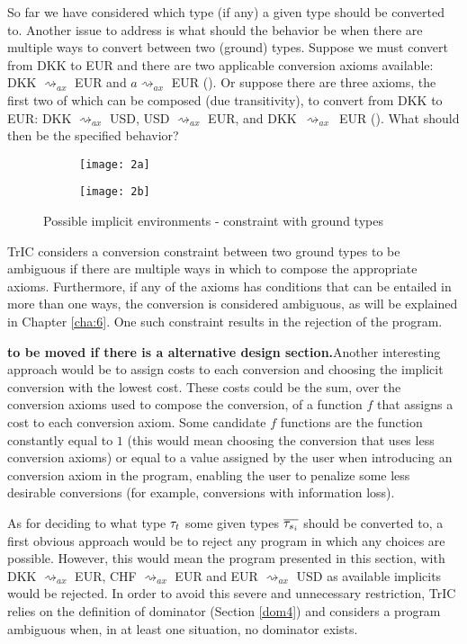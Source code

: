 So far we have considered which type (if any) a given type should be converted to. Another issue to address is what should the behavior be when there are multiple ways to convert between two (ground) types. Suppose we must convert from DKK to EUR and there are two applicable conversion axioms available: DKK $\rightsquigarrow_{ax}$ EUR and $a \rightsquigarrow_{ax}$ EUR (). Or suppose there are three axioms, the first two of which can be composed (due transitivity), to convert from DKK to EUR: DKK $\rightsquigarrow_{ax}$ USD, USD $\rightsquigarrow_{ax}$ EUR, and DKK~$\rightsquigarrow_{ax}$~EUR (). What should then be the specified behavior?
\begin{figure}
  \centering
  \begin{subfigure}{.20\textwidth}
    \centering
    \texttt{[image: 2a]}
    \caption{}
    \label{2a}
  \end{subfigure}
  \begin{subfigure}{.20\textwidth}
    \centering
    \texttt{[image: 2b]}
    \caption{}
    \label{2b}
  \end{subfigure}
  \caption{Possible implicit environments - constraint with ground types}
\end{figure}

TrIC considers a conversion constraint between two ground types to be ambiguous if there are multiple ways in which to compose the appropriate axioms. Furthermore, if any of the axioms has conditions that can be entailed in more than one ways, the conversion is considered ambiguous, as will be explained in Chapter \ref{cha:6}. One such constraint results in the rejection of the program.

\textbf{to be moved if there is a alternative design section.}Another interesting approach would be to assign costs to each conversion and choosing the implicit conversion with the lowest cost. These costs could be the sum, over the conversion axioms used to compose the conversion, of a function $f$ that assigns a cost to each conversion axiom. Some candidate $f$ functions are the function constantly equal to $1$ (this would mean choosing the conversion that uses less conversion axioms) or equal to a value assigned by the user when introducing an conversion axiom in the program, enabling the user to penalize some less desirable conversions (for example, conversions with information loss).

As for deciding to what type $\mathit{\tau}_t$ some given types $\overline{\mathit{\tau}_{s_i}}$ should be converted to, a first obvious approach would be to reject any program in which any choices are possible. However, this would mean the program presented in this section, with DKK $\rightsquigarrow_{ax}$ EUR, CHF $\rightsquigarrow_{ax}$ EUR and EUR $\rightsquigarrow_{ax}$ USD as available implicits would be rejected. In order to avoid this severe and unnecessary restriction, TrIC relies on the definition of dominator (Section \ref{dom4}) and considers a program ambiguous when, in at least one situation, no dominator exists.

